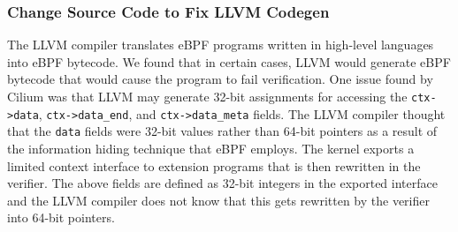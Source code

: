 %     

\subsubsection{Change Source Code to Fix LLVM Codegen}
\label{motivation:llvm-codegen}
The LLVM compiler translates eBPF programs written in high-level languages into eBPF bytecode.
We found that in certain cases, LLVM would generate eBPF bytecode that would cause the program to fail verification.
One issue found by Cilium was that LLVM may generate 32-bit assignments for
    accessing the \texttt{ctx->data}, \texttt{ctx->data\_end}, and \texttt{ctx->data\_meta} fields.
The LLVM compiler thought that the \texttt{data} fields were 32-bit values rather than 64-bit pointers as
    a result of the information hiding technique that
    eBPF employs.
The kernel exports a limited context interface to extension programs that is then rewritten in the verifier.
The above fields are defined as 32-bit integers in the exported interface and
    the LLVM compiler does not know that this gets rewritten by the verifier into 64-bit pointers.



